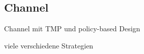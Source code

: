 \subsection{Channel}
\begin{itemize*}
\item Channel mit TMP und policy-based Design
\item viele verschiedene Strategien
\end{itemize*}


